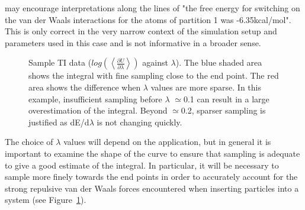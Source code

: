 \noindent may encourage interpretations along the lines of "the free energy for
switching on the van der Waals interactions for the atoms of partition 1 was
-6.35kcal/mol". This is only correct in the very narrow context of the
simulation setup and parameters used in this case and is not informative in a
broader sense.


\begin{figure}
  \caption{Sample TI data ($log(\left<\frac{\partial U}{\partial\lambda}\right>)$ against $\lambda$). The blue shaded
  area shows the integral with fine sampling close to the end point. The red area
  shows the difference when $\lambda$ values are more sparse. In this example,
  insufficient sampling before $\lambda$ $\simeq$0.1 can result in a large overestimation
  of the integral. Beyond $\simeq$0.2, sparser sampling is justified as dE/d$\lambda$ is not
  changing quickly.}
  \label{fig:TI}
\end{figure}


The choice of $\lambda$ values will depend on the application, but in general
it is important to examine the shape of the curve to ensure that sampling is
adequate to give a good estimate of the integral. In particular, it will be
necessary to sample more finely towards the end points in order to accurately
account for the strong repulsive van der Waals forces encountered when
inserting particles into a system (see Figure~\ref{fig:TI}).



%
%
%

%
